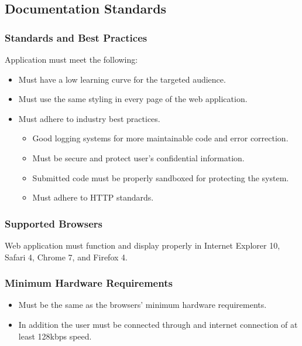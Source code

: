 \subsection{Documentation Standards}
\label{sec:stand}
\subsubsection{Standards and Best Practices}

Application must meet the following:

\begin{itemize}
\item Must have a low learning curve for the targeted audience.
\item Must use the same styling in every page of the web application.
\item Must adhere to industry best practices.
\begin{itemize}
\item Good logging systems for more maintainable code and error correction.
\item Must be secure and protect user's confidential information.
\item Submitted code must be properly sandboxed for protecting the system.
\item Must adhere to HTTP standards.
\end{itemize}
\end{itemize}

\subsubsection{Supported Browsers}

Web application must function and display properly in Internet Explorer 10, 
Safari 4, Chrome 7, and Firefox 4.

\subsubsection{Minimum Hardware Requirements}
\begin{itemize}
\item Must be the same as the browsers' minimum hardware requirements.
\item In addition the user must be connected through and internet connection of
at least 128kbps speed.
\end{itemize}
